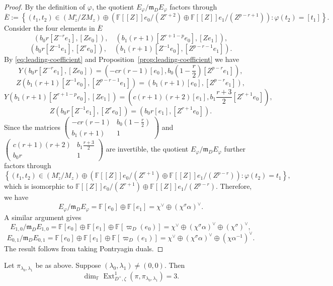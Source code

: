 \documentclass[11pt,a4paper]{article} %
\def\FF{\mathbb{F}}
\def\dim{\operatorname{dim}}
\def\Ext{\operatorname{Ext}} %
\begin{document}
\begin{proof}
    By the definition of $\varphi$, the quotient $E_\varphi/\mathfrak{m}_DE_\varphi$ factors through
    \[
    \overline{E}:=\left\{(t_1,t_2)\in (M_z^\circ/ZM_z)\oplus\left(\FF[[Z]]e_0/(Z^{r+2})\oplus\FF[[Z]]e_1/(Z^{p-r+1})\right):\varphi(t_2)=[t_1]\right\}.
    \]
    Consider the four elements in $\overline{E}$ 
    \[
    \left(b_0r[Z^{-r}e_1],[Ze_0]\right),\quad\left(b_1(r+1)[Z^{r+1-p}e_0],[Ze_1]\right),
    \]
    \[
    \left(b_0r[Z^{-1}e_1],[Z^re_0]\right),\quad\left(b_1(r+1)[Z^{-1}e_0],[Z^{p-r-1}e_1]\right).
    \]
    By \eqref{eq:leading-coefficient} and Proposition~\ref{prop:leading-coefficient} we have
    \[
    Y\left(b_0r[Z^{-r}e_1],[Ze_0]\right)=\left(-cr(r-1)[e_0],b_0(1-\frac{r}{2})[Z^{p-r}e_1]\right),
    \]
    \[
    Z\left(b_1(r+1)[Z^{-1}e_0],[Z^{p-r-1}e_1]\right)=\left(b_1(r+1)[e_0],[Z^{p-r}e_1]\right),
    \]
    \[
    Y\left(b_1(r+1)[Z^{r+1-p}e_0],[Ze_1]\right)=\left(c(r+1)(r+2)[e_1],b_1\frac{r+3}{2}[Z^{r+1}e_0]\right),
    \]
    \[
    Z\left(b_0r[Z^{-1}e_1],[Z^re_0]\right)=\left(b_0r[e_1],[Z^{r+1}e_0]\right).
    \]
    Since the matrices $
    \begin{pmatrix}
    -cr(r-1) & b_0(1-\frac{r}{2})\\
    b_1(r+1) & 1
    \end{pmatrix} $ and $
    \begin{pmatrix}
    c(r+1)(r+2) & b_1\frac{r+3}{2}\\
    b_0r & 1
    \end{pmatrix}$ are invertible, the quotient $E_\varphi/\mathfrak{m}_DE_\varphi$ further factors through
    \[
    \left\{(t_1,t_2)\in (M_z^\circ/M_z)\oplus\left(\FF[[Z]]e_0/(Z^{r+1})\oplus\FF[[Z]]e_1/(Z^{p-r})\right):\varphi(t_2)=t_1\right\},
    \]
    which is isomorphic to $\FF[[Z]]e_0/(Z^{r+1})\oplus\FF[[Z]]e_1/(Z^{p-r})$. Therefore, we have
    \[
    E_\varphi/\mathfrak{m}_DE_\varphi=\FF[e_0]\oplus\FF[e_1]=\chi^\vee\oplus(\chi^\sigma\alpha)^\vee.
    \]
    A similar argument gives
    \[
    E_{1,0}/\mathfrak{m}_DE_{1,0}=\FF[e_0]\oplus\FF[e_1]\oplus\FF[\varpi_D(e_0)]=\chi^\vee\oplus(\chi^\sigma\alpha)^\vee\oplus(\chi^\sigma)^\vee,
    \]
    \[
    E_{0,1}/\mathfrak{m}_DE_{0,1}=\FF[e_0]\oplus\FF[e_1]\oplus\FF[\varpi_D(e_1)]=\chi^\vee\oplus(\chi^\sigma\alpha)^\vee\oplus(\chi\alpha^{-1})^\vee.
    \]
    The result follows from taking Pontryagin duals.
\end{proof}

\begin{proposition}\label{prop:application}
    Let $\pi_{\lambda_0,\lambda_1}$ be as above. Suppose $(\lambda_0,\lambda_1)\ne(0,0)$. Then
    \[
    \dim_\FF\Ext^1_{D^\times,\zeta}(\pi,\pi_{\lambda_0,\lambda_1})=3.
    \]
\end{proposition}
\end{document}
